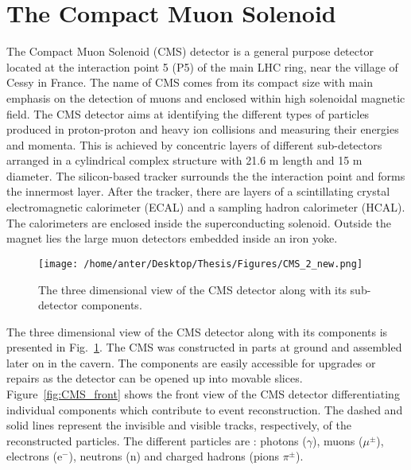 \section{The Compact Muon Solenoid}
The Compact Muon Solenoid (CMS) detector is a general purpose detector located at the interaction point 5 (P5) of the main LHC ring, near the village of Cessy in France. The name of CMS comes from its compact size with main emphasis on the detection of muons and enclosed within high solenoidal magnetic field. The CMS detector aims at identifying the different types of particles produced in proton-proton and heavy ion collisions and measuring their energies and momenta. This is achieved by concentric layers of different sub-detectors arranged in a cylindrical complex structure with 21.6 m length and 15 m diameter. The silicon-based tracker surrounds the the interaction point and forms the innermost layer. After the tracker, there are layers of a scintillating crystal electromagnetic calorimeter (ECAL) and a sampling hadron calorimeter (HCAL). The calorimeters are enclosed inside the superconducting solenoid. Outside the magnet lies the large muon detectors embedded inside an iron yoke. 
\begin{figure}[!h]
\begin{center}
\vspace{1mm}
\hspace*{-6mm}
\texttt{[image: /home/anter/Desktop/Thesis/Figures/CMS\_2\_new.png]}\\
\vspace*{5mm}
\caption[The three dimensional view of the CMS detector along with its sub-detector components.]{The three dimensional view of the CMS detector along with its sub-detector components\footnotemark.}
\vspace{-3mm}
\label{fig:CMS}
\end{center}
\end{figure}The three dimensional view of the CMS detector along with its components is presented in Fig.~\ref{fig:CMS}. The CMS was constructed in parts at ground and assembled later on in the cavern. The components are easily accessible for upgrades or repairs as the detector can be opened up into movable slices. Figure~\ref{fig:CMS_front} shows the front view of the CMS detector differentiating individual components which contribute to event reconstruction. The dashed and solid lines represent the invisible and visible tracks, respectively, of the reconstructed particles. The different particles are : photons ($\gamma$), muons ($\mu^{\pm}$), electrons (e$^{-}$), neutrons (n) and charged hadrons (pions $\pi^{\pm}$).

